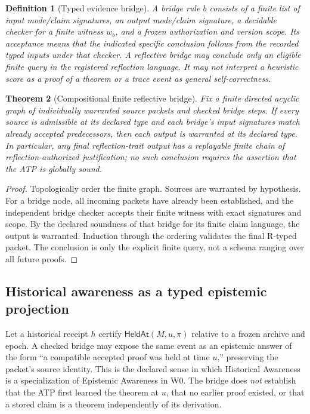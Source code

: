 \documentclass[11pt,letterpaper]{article}
\newtheorem{theorem}{Theorem}[section]
\newtheorem{definition}[theorem]{Definition}
\begin{document}
\begin{definition}[Typed evidence bridge]\label{def:bridge}
A bridge rule $b$ consists of a finite list of input mode/claim signatures, an output mode/claim signature, a decidable checker for a finite witness $w_b$, and a frozen authorization and version scope. Its acceptance means that the indicated \emph{specific} conclusion follows from the recorded typed inputs under that checker. A reflective bridge may conclude only an eligible finite query in the registered reflection language. It may not interpret a heuristic score as a proof of a theorem or a trace event as general self-correctness.
\end{definition}
\begin{theorem}[Compositional finite reflective bridge]\label{thm:bridge}
Fix a finite directed acyclic graph of individually warranted source packets and checked bridge steps. If every source is admissible at its declared type and each bridge's input signatures match already accepted predecessors, then each output is warranted at its declared type. In particular, any final reflection-trait output has a replayable finite chain of reflection-authorized justification; no such conclusion requires the assertion that the ATP is globally sound.
\end{theorem}
\begin{proof}
Topologically order the finite graph. Sources are warranted by hypothesis. For a bridge node, all incoming packets have already been established, and the independent bridge checker accepts their finite witness with exact signatures and scope. By the declared soundness of that bridge for its finite claim language, the output is warranted. Induction through the ordering validates the final R-typed packet. The conclusion is only the explicit finite query, not a schema ranging over all future proofs.
\end{proof}

\subsection{Historical awareness as a typed epistemic projection}
Let a historical receipt $h$ certify $\mathsf{HeldAt}(M,u,\pi)$ relative to a frozen archive and epoch. A checked bridge may expose the same event as an epistemic answer of the form ``a compatible accepted proof was held at time $u$,'' preserving the packet's source identity. This is the declared sense in which Historical Awareness is a specialization of Epistemic Awareness in W0. The bridge does \emph{not} establish that the ATP first learned the theorem at $u$, that no earlier proof existed, or that a stored claim is a theorem independently of its derivation.
\end{document}

